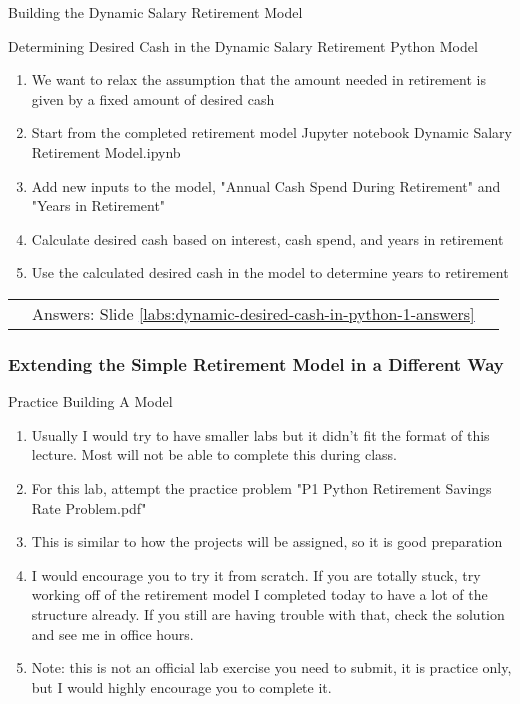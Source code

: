 \documentclass[handout, 11pt]{beamer}
\begin{document}
\begin{section}{Building the Dynamic Salary Retirement Model}
\begin{frame}
{\begin{block}{Determining Desired Cash in the Dynamic Salary Retirement Python Model}
\begin{enumerate}
\item We want to relax the assumption that the amount needed in retirement is given by a fixed amount of desired cash
\item Start from the completed retirement model Jupyter notebook Dynamic Salary Retirement Model.ipynb
\item Add new inputs to the model, "Annual Cash Spend During Retirement" and "Years in Retirement"
\item Calculate desired cash based on interest, cash spend, and years in retirement
\item Use the calculated desired cash in the model to determine years to retirement
\end{enumerate}
\vfill
\begin{tabular*}{\textwidth}{@{\extracolsep{\fill}}ccc}
\toprule
\hfill & Answers: Slide \textcolor{blue}{\underline{\ref{labs:dynamic-desired-cash-in-python-1-answers}}} & \hfill\\

\end{tabular*}
\end{block}
}
\label{labs:dynamic-desired-cash-in-python-1}
\end{frame}
\begin{frame}
\frametitle{Extending the Simple Retirement Model in a Different Way}
{
\begin{block}{Practice Building A Model}
\begin{enumerate}
\item Usually I would try to have smaller labs but it didn't fit the format of this lecture. Most will not be able to complete this during class.
\item For this lab, attempt the practice problem "P1 Python Retirement Savings Rate Problem.pdf"
\item This is similar to how the projects will be assigned, so it is good preparation
\item I would encourage you to try it from scratch. If you are totally stuck, try working off of the retirement model I completed today to have a lot of the structure already. If you still are having trouble with that, check the solution and see me in office hours.
\item Note: this is not an official lab exercise you need to submit, it is practice only, but I would highly encourage you to complete it.
\end{enumerate}
\vfill
\end{block}
}
\label{lab:retire-model-1}
\end{frame}
\end{section}
\end{document}
